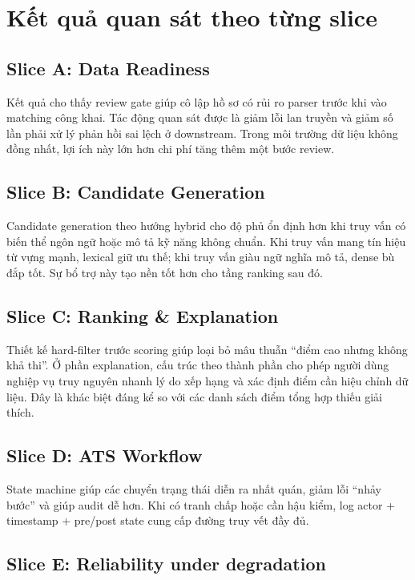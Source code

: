 \section{Kết quả quan sát theo từng slice}

\subsection{Slice A: Data Readiness}

Kết quả cho thấy review gate giúp cô lập hồ sơ có rủi ro parser trước khi vào matching công khai. Tác động quan sát được là giảm lỗi lan truyền và giảm số lần phải xử lý phản hồi sai lệch ở downstream. Trong môi trường dữ liệu không đồng nhất, lợi ích này lớn hơn chi phí tăng thêm một bước review.

\subsection{Slice B: Candidate Generation}

Candidate generation theo hướng hybrid cho độ phủ ổn định hơn khi truy vấn có biến thể ngôn ngữ hoặc mô tả kỹ năng không chuẩn. Khi truy vấn mang tín hiệu từ vựng mạnh, lexical giữ ưu thế; khi truy vấn giàu ngữ nghĩa mô tả, dense bù đắp tốt. Sự bổ trợ này tạo nền tốt hơn cho tầng ranking sau đó.

\subsection{Slice C: Ranking \& Explanation}

Thiết kế hard-filter trước scoring giúp loại bỏ mâu thuẫn ``điểm cao nhưng không khả thi''. Ở phần explanation, cấu trúc theo thành phần cho phép người dùng nghiệp vụ truy nguyên nhanh lý do xếp hạng và xác định điểm cần hiệu chỉnh dữ liệu. Đây là khác biệt đáng kể so với các danh sách điểm tổng hợp thiếu giải thích.

\subsection{Slice D: ATS Workflow}

State machine giúp các chuyển trạng thái diễn ra nhất quán, giảm lỗi ``nhảy bước'' và giúp audit dễ hơn. Khi có tranh chấp hoặc cần hậu kiểm, log actor + timestamp + pre/post state cung cấp đường truy vết đầy đủ.

\subsection{Slice E: Reliability under degradation}

